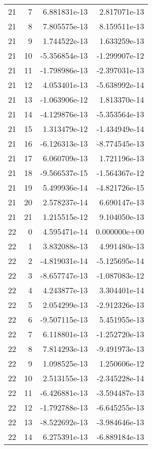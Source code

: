 \begin{tabular}{rrrr}
  21 &    7 &  6.881831e-13 &  2.817071e-13 \\
  21 &    8 &  7.805575e-13 &  8.159511e-13 \\
  21 &    9 &  1.744522e-13 &  1.633259e-13 \\
  21 &   10 & -5.356854e-13 & -1.299907e-12 \\
  21 &   11 & -1.798986e-13 & -2.397031e-13 \\
  21 &   12 &  4.053401e-13 & -5.638992e-14 \\
  21 &   13 & -1.063906e-12 &  1.813370e-14 \\
  21 &   14 & -4.129876e-13 & -5.353564e-13 \\
  21 &   15 &  1.313479e-12 & -1.434949e-14 \\
  21 &   16 & -6.126313e-13 & -8.774545e-13 \\
  21 &   17 &  6.060709e-13 &  1.721196e-13 \\
  21 &   18 & -9.566537e-15 & -1.564367e-12 \\
  21 &   19 &  5.499936e-14 & -4.821726e-15 \\
  21 &   20 &  2.578237e-14 &  6.690147e-13 \\
  21 &   21 &  1.215515e-12 &  9.104050e-13 \\
  22 &    0 &  4.595471e-14 &  0.000000e+00 \\
  22 &    1 &  3.832088e-13 &  4.991480e-13 \\
  22 &    2 & -4.819031e-14 & -5.125695e-14 \\
  22 &    3 & -8.657747e-13 & -1.087083e-12 \\
  22 &    4 &  4.243877e-13 &  3.304401e-14 \\
  22 &    5 &  2.054299e-13 & -2.912326e-13 \\
  22 &    6 & -9.507115e-13 &  5.451955e-13 \\
  22 &    7 &  6.118801e-13 & -1.252720e-13 \\
  22 &    8 &  7.814293e-13 & -9.491973e-13 \\
  22 &    9 &  1.098525e-13 &  1.250606e-12 \\
  22 &   10 &  2.513155e-13 & -2.345228e-14 \\
  22 &   11 & -6.426881e-13 & -3.594487e-13 \\
  22 &   12 & -1.792788e-13 & -6.645255e-13 \\
  22 &   13 & -8.522692e-13 & -3.984646e-13 \\
  22 &   14 &  6.275391e-13 & -6.889184e-13 \\

\end{tabular}
